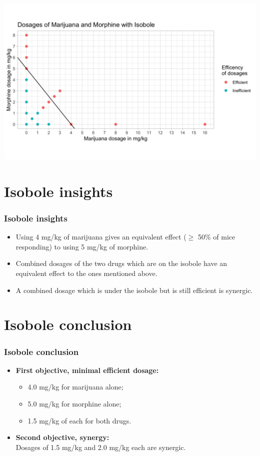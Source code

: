 \documentclass[14pt]{beamer}
\begin{document}
\begin{frame}
\begin{center}
\includegraphics[scale=0.24]{img8.png}
\end{center}
\end{frame}

\section{Isobole insights}
\begin{frame}
\frametitle{Isobole insights}
\begin{itemize}[label={$\blacktriangleright$}]
\item Using 4 mg/kg of marijuana gives an equivalent effect ($\geq$ 50\% of mice responding) to using 5 mg/kg of morphine.
\item Combined dosages of the two drugs which are on the isobole have an equivalent effect to the ones mentioned above.
\item A combined dosage which is under the isobole but is still efficient is synergic.
\end{itemize}
\end{frame}

\section{Isobole conclusion}
\begin{frame}
\frametitle{Isobole conclusion}
\begin{itemize}[label={\checkmark}]
\item \textbf{First objective, minimal efficient dosage:} \\
\begin{itemize}[label={$\blacktriangleright$}]
\item 4.0 mg/kg for marijuana alone;
\item 5.0 mg/kg for morphine alone;
\item 1.5 mg/kg of each for both drugs.
\end{itemize}
\item \textbf{Second objective, synergy:} \\
Dosages of 1.5 mg/kg and 2.0 mg/kg each are synergic.
\end{itemize}
\end{frame}
\end{document}
